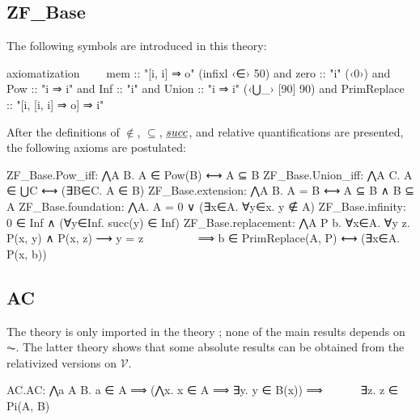 \subsection{ZF\_Base}
The following symbols are introduced in this theory:
\begin{isabelle}
axiomatization\isanewline
\ \ \ \      mem :: "[i, i] ⇒ o"  (infixl ‹∈› 50)  \isanewline
  and zero :: "i"  (‹0›)  \isanewline
  and Pow :: "i ⇒ i"  \isanewline
  and Inf :: "i"  \isanewline
  and Union :: "i ⇒ i"  (‹⋃\_› [90] 90)\isanewline
  and PrimReplace :: "[i, [i, i] ⇒ o] ⇒ i"
\end{isabelle}
\noindent After the definitions of $\notin$, $\subseteq$, $\isa{succ}$,
and relative quantifications are presented, the following axioms are postulated:
\begin{isabelle}
ZF\_Base.Pow\_iff: ⋀A B. A ∈ Pow(B) ⟷ A ⊆ B\isanewline
ZF\_Base.Union\_iff: ⋀A C. A ∈ ⋃C ⟷ (∃B∈C. A ∈ B)\isanewline
ZF\_Base.extension: ⋀A B. A = B ⟷ A ⊆ B ∧ B ⊆ A\isanewline
ZF\_Base.foundation: ⋀A. A = 0 ∨ (∃x∈A. ∀y∈x. y ∉ A)\isanewline
ZF\_Base.infinity: 0 ∈ Inf ∧ (∀y∈Inf. succ(y) ∈ Inf)\isanewline
ZF\_Base.replacement: ⋀A P b. ∀x∈A. ∀y z. P(x, y) ∧ P(x, z) ⟶ y = z \isanewline
\ \ \ \ \ \ \ \ \ ⟹ b ∈ PrimReplace(A, P) ⟷ (∃x∈A. P(x, b))
\end{isabelle}

\subsection{AC}

The theory  is only imported in the theory
; none of the main results
depends on $\AC$. The latter theory
shows that some absolute results can be obtained from the
relativized versions on $\mathcal{V}$.

\begin{isabelle}
AC.AC: ⋀a A B. a ∈ A ⟹ (⋀x. x ∈ A ⟹ ∃y. y ∈ B(x)) ⟹\isanewline
  \ \ \ \ \ \ ∃z. z ∈ Pi(A, B)
\end{isabelle}

